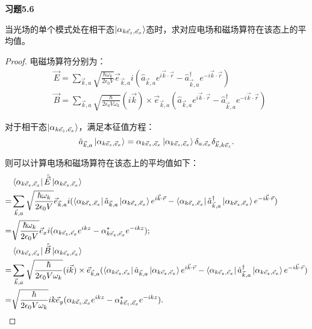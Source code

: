 \documentclass[reqno,a4paper,12pt]{amsart}
\begin{document}
\medskip

\textbf{习题5.6}

当光场的单个模式处在相干态$\ket{\alpha_{k\vec{e}_z, \vec{e}_x}}$态时，求对应电场和磁场算符在该态上的平均值。

\begin{proof}
电磁场算符分别为：
\begin{align*}
	&\vec{E} = \sum_{\vec{k}, a} \sqrt{\frac{\hbar\omega_k}{2\epsilon_0 V}} \vec{e}_{\vec{k}, a} i (\hat{a}_{\vec{k}, a} e^{i\vec{k}\cdot\vec{r}} - \hat{a}_{\vec{k}, a}^\dagger e^{-i\vec{k}\cdot\vec{r}}) \\
	&\vec{B} = \sum_{\vec{k}, a} \sqrt{\frac{\hbar}{2\epsilon_0 V \omega_k}} (i\vec{k})\times \vec{e}_{\vec{k}, a} (\hat{a}_{\vec{k}, a} e^{i\vec{k}\cdot\vec{r}} - \hat{a}_{\vec{k}, a}^\dagger e^{-i\vec{k}\cdot\vec{r}}) 
\end{align*}

对于相干态$\ket{\alpha_{k\vec{e}_z, \vec{e}_x}}$，满足本征值方程：
\[
	\hat{a}_{\vec{k}, a} \ket{\alpha_{k\vec{e}_z, \vec{e}_x}} = \alpha_{k\vec{e}_z, \vec{e}_x} \ket{\alpha_{k\vec{e}_z, \vec{e}_x}} \delta_{a,\vec{e}_x} \delta_{\vec{k}, k\vec{e}_z}.
\]

则可以计算电场和磁场算符在该态上的平均值如下：
\begin{align*}
	&\bra{\alpha_{k\vec{e}_z, \vec{e}_x}} \hat{\vec{E}} \ket{\alpha_{k\vec{e}_z, \vec{e}_x}} \\
	=& \sum_{\vec{k}, a} \sqrt{\frac{\hbar\omega_k}{2\epsilon_0 V}} \vec{e}_{\vec{k}, a} i ( \bra{\alpha_{k\vec{e}_z, \vec{e}_x}} \hat{a}_{\vec{k}, a} \ket{\alpha_{k\vec{e}_z, \vec{e}_x}} e^{i\vec{k} \cdot \vec{r}} - \bra{\alpha_{k\vec{e}_z, \vec{e}_x}} \hat{a}^\dagger_{\vec{k}, a} \ket{\alpha_{k\vec{e}_z, \vec{e}_x}} e^{-i\vec{k} \cdot \vec{r}}) \\
	=& \sqrt{\frac{\hbar\omega_k}{2\epsilon_0 V}} \vec{e}_x i (\alpha_{k\vec{e}_z, \vec{e}_x} e^{ikz} - \alpha_{k\vec{e}_z, \vec{e}_x}^* e^{-ikz}); \\
	&\bra{\alpha_{k\vec{e}_z, \vec{e}_x}} \hat{\vec{B}} \ket{\alpha_{k\vec{e}_z, \vec{e}_x}} \\
	=& \sum_{\vec{k}, a} \sqrt{\frac{\hbar}{2\epsilon_0 V \omega_k}} (i\vec{k})\times\vec{e}_{\vec{k}, a} (\bra{\alpha_{k\vec{e}_z, \vec{e}_x}} \hat{a}_{\vec{k}, a} \ket{\alpha_{k\vec{e}_z, \vec{e}_x}} e^{i\vec{k}\cdot \vec{r}} - \bra{\alpha_{k\vec{e}_z, \vec{e}_x}} \hat{a}^\dagger_{\vec{k}, a} \ket{\alpha_{k\vec{e}_z, \vec{e}_x}} e^{-i\vec{k} \cdot \vec{r}}) \\
	=& \sqrt{\frac{\hbar}{2\epsilon_0 V \omega_k}} ik\vec{e}_y (\alpha_{k\vec{e}_z, \vec{e}_x} e^{ikz} - \alpha^*_{k\vec{e}_z, \vec{e}_x} e^{-ikz}).
\end{align*}

\end{proof}
\end{document}
